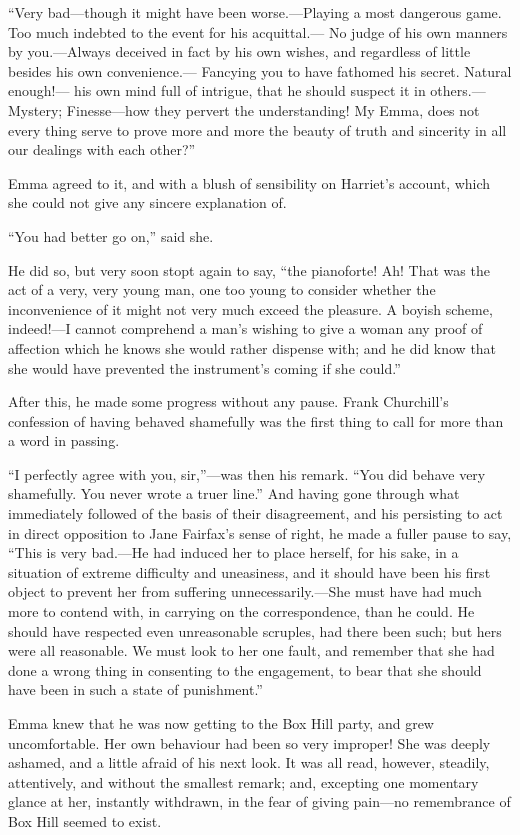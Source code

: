 ``Very bad---though it might have been worse.---Playing a most
dangerous game.  Too much indebted to the event for his acquittal.---%
No judge of his own manners by you.---Always deceived in fact by his
own wishes, and regardless of little besides his own convenience.---%
Fancying you to have fathomed his secret.  Natural enough!---%
his own mind full of intrigue, that he should suspect it
in others.---Mystery; Finesse---how they pervert the understanding!
My Emma, does not every thing serve to prove more and more the
beauty of truth and sincerity in all our dealings with each other?''

Emma agreed to it, and with a blush of sensibility on Harriet's account,
which she could not give any sincere explanation of.

``You had better go on,'' said she.

He did so, but very soon stopt again to say, ``the pianoforte!
Ah!  That was the act of a very, very young man, one too young
to consider whether the inconvenience of it might not very much
exceed the pleasure.  A boyish scheme, indeed!---I cannot
comprehend a man's wishing to give a woman any proof of affection
which he knows she would rather dispense with; and he did
know that she would have prevented the instrument's coming if she could.''

After this, he made some progress without any pause.
Frank Churchill's confession of having behaved shamefully
was the first thing to call for more than a word in passing.

``I perfectly agree with you, sir,''---was then his remark.
``You did behave very shamefully.  You never wrote a truer line.''
And having gone through what immediately followed of the basis
of their disagreement, and his persisting to act in direct
opposition to Jane Fairfax's sense of right, he made a fuller pause
to say, ``This is very bad.---He had induced her to place herself,
for his sake, in a situation of extreme difficulty and uneasiness,
and it should have been his first object to prevent her from
suffering unnecessarily.---She must have had much more to contend with,
in carrying on the correspondence, than he could.  He should have
respected even unreasonable scruples, had there been such; but hers
were all reasonable.  We must look to her one fault, and remember
that she had done a wrong thing in consenting to the engagement,
to bear that she should have been in such a state of punishment.''

Emma knew that he was now getting to the Box Hill party,
and grew uncomfortable.  Her own behaviour had been so very improper!
She was deeply ashamed, and a little afraid of his next look.
It was all read, however, steadily, attentively, and without
the smallest remark; and, excepting one momentary glance at her,
instantly withdrawn, in the fear of giving pain---no remembrance
of Box Hill seemed to exist.

